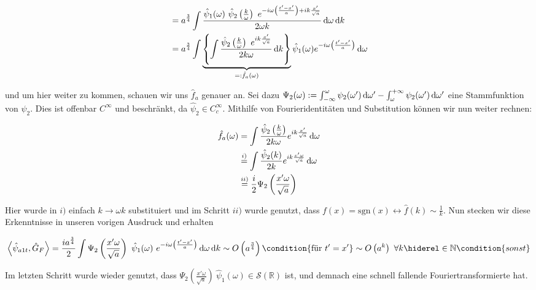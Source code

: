 \begin{align}
    &=
    a^{\frac{3}{4}} \int \frac{
    \hat \psi_1(\omega)
    ~\hat\psi_2 \left(\frac{k}{\omega}\right)
    ~ e^{-i \omega \left(\frac{t'-x'}{a}\right) + i k \frac{x'}{\sqrt{a}}}
    }
    {
    2\omega k
    } \mathop{}\!\mathrm{d} \omega \mathop{}\!\mathrm{d} k \nonumber \\
    &= a^{\frac{3}{4}} \int
    \underbrace{\left\{ \int \frac{\hat \psi_2\left(\frac{k}{\omega}\right)
        ~e^{ik\frac{x'}{\sqrt{a}}}
        }
        {
            2 k \omega
        }
        \mathop{}\!\mathrm{d} k
        \right\}}_{=: \hat f_a (\omega)}
    \hat \psi_1(\omega) e^{-i \omega \left(\frac{t'-x'}{a}\right)}
    \mathop{}\!\mathrm{d} \omega
\end{align}

und um hier weiter zu kommen, schauen wir uns $\hat f_a$ genauer an. Sei dazu
$\Psi_2(\omega) := \int_{-\infty}^\omega \psi_2(\omega ') \mathop{}\!\mathrm{d} \omega '
    -  \int_{\omega}^{+ \infty} \psi_2(\omega ') \mathop{}\!\mathrm{d} \omega '$ eine
Stammfunktion von $\psi_2$. Dies ist offenbar $C^\infty$ und beschränkt, da
 $\hat \psi_2 \in C^\infty_c$. Mithilfe von Fourieridentitäten und Substitution können wir nun weiter rechnen:

\begin{align*}
    \hat f_a (\omega) &=
    \int \frac{\hat \psi_2\left(\frac{k}{\omega}\right)}{2k\omega}
    e^{i k \frac{x'}{\sqrt{a}}}
    \mathop{}\!\mathrm{d} \omega \\
    &\stackrel{i)}{=}
    \int \frac{\hat \psi_2 (k)}{2k}e^{ik\frac{x' \omega}{\sqrt{a}}}
    \mathop{}\!\mathrm{d} \omega \\
    &\stackrel{ii)}{=} \frac{i}{2}  \Psi_2\left(\frac{x' \omega}{\sqrt{a}}\right)
\end{align*}

Hier wurde in $i)$ einfach $k \rightarrow \omega k$ substituiert und im Schritt $ii)$
wurde genutzt, dass $f(x) = \mathrm{sgn}(x) \leftrightarrow \hat f(k) \sim \frac{1}{k}$.
Nun stecken wir diese Erkenntnisse in unseren vorigen Ausdruck und erhalten

\begin{dmath}
 \left\langle \hat\psi_{a1t}, \hat G_F \right\rangle
    =
    \frac{i a^{\frac{3}{4}}}{2} \int \Psi_2\left(\frac{x' \omega}{\sqrt{a}}\right)
    ~\hat \psi_1(\omega)
    ~ e^{-i \omega \left(\frac{t'-x'}{a}\right)}
    \d \omega \d k
    \sim O\left(a^{\frac{3}{4}}\right)  \condition{\textrm{für } t'=x'}
    \sim O\left(a^k\right) ~ \forall k \hiderel \in \mathbb{N} \condition{sonst}
\end{dmath}

Im letzten Schritt wurde wieder genutzt, dass
$\Psi_2\left(\frac{x' \omega}{\sqrt{a}}\right) ~\hat \psi_1(\omega) \in \mathcal{S}(\mathbb{R})$
ist, und demnach eine schnell fallende Fouriertransformierte hat.

